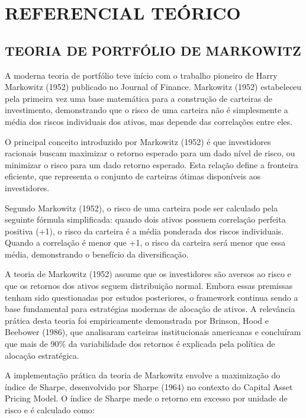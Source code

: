 
\chapter{REFERENCIAL TEÓRICO}

\section{TEORIA DE PORTFÓLIO DE MARKOWITZ}

A moderna teoria de portfólio teve início com o trabalho pioneiro de Harry Markowitz (1952) publicado no Journal of Finance. Markowitz (1952) estabeleceu pela primeira vez uma base matemática para a construção de carteiras de investimento, demonstrando que o risco de uma carteira não é simplesmente a média dos riscos individuais dos ativos, mas depende das correlações entre eles.

O principal conceito introduzido por Markowitz (1952) é que investidores racionais buscam maximizar o retorno esperado para um dado nível de risco, ou minimizar o risco para um dado retorno esperado. Esta relação define a fronteira eficiente, que representa o conjunto de carteiras ótimas disponíveis aos investidores.

Segundo Markowitz (1952), o risco de uma carteira pode ser calculado pela seguinte fórmula simplificada: quando dois ativos possuem correlação perfeita positiva (+1), o risco da carteira é a média ponderada dos riscos individuais. Quando a correlação é menor que +1, o risco da carteira será menor que essa média, demonstrando o benefício da diversificação.

A teoria de Markowitz (1952) assume que os investidores são aversos ao risco e que os retornos dos ativos seguem distribuição normal. Embora essas premissas tenham sido questionadas por estudos posteriores, o framework continua sendo a base fundamental para estratégias modernas de alocação de ativos. A relevância prática desta teoria foi empiricamente demonstrada por Brinson, Hood e Beebower (1986), que analisaram carteiras institucionais americanas e concluíram que mais de 90\% da variabilidade dos retornos é explicada pela política de alocação estratégica.

A implementação prática da teoria de Markowitz envolve a maximização do índice de Sharpe, desenvolvido por Sharpe (1964) no contexto do Capital Asset Pricing Model. O índice de Sharpe mede o retorno em excesso por unidade de risco e é calculado como:

